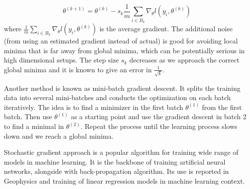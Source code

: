 \documentclass[12pt]{article}
\theoremstyle{definition}
\theoremstyle{property}
\theoremstyle{assumption}
\theoremstyle{example}
\theoremstyle{comment}
\begin{document}
\[
\theta^{(k+1)}= \theta^{(k)}-s_k \frac{1}{m}\sum_{i\in B_k} \nabla_\theta l (y_i, \theta^{(k)})
\]
where $\frac{1}{m}\sum_{i\in B_k} \nabla_\theta l (y_i, \theta^{(k)})$ is the average gradient. The additional noise (from using an estimated gradient instead of actual) is good for avoiding local minima that is far away from global minima, which can be potentially serious in high dimensional setups. The step size $s_k$ decreases as we approach the correct global minima and it is known to give an error in $\frac{1}{\sqrt{k}}$. \par
Another method is known as mini-batch gradient descent. It splits the training data into several mini-batches and conducts the optimization on each batch iteratively. The idea is to find a minimizer in the first batch $\theta^{(1)}$ from the first batch. Then use $\theta^{(1)}$ as a starting point and use the gradient descent in batch 2 to find a minimal in $\theta^{(2)}$. Repeat the process until the learning process slows down and we reach a global minima. \par
Stochastic gradient approach is a popular algorithm for training wide range of models in machine learning. It is the backbone of training artificial neural networks, alongside with back-propagation algorithm. Its use is reported in Geophysics and training of linear regression models in machine learning context. 
\end{document}
